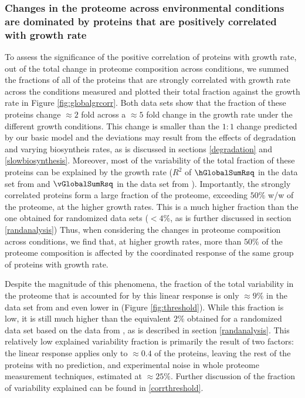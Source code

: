 \subsubsection{Changes in the proteome across environmental conditions are dominated by proteins that are positively correlated with growth rate}
To assess the significance of the positive correlation of proteins with growth rate, out of the total change in proteome composition across conditions, we summed the fractions of all of the proteins that are strongly correlated with growth rate across the conditions measured and plotted their total fraction against the growth rate in Figure \ref{fig:globalgrcorr}.
Both data sets show that the fraction of these proteins change $\approx 2$ fold across a $\approx 5$ fold change in the growth rate under the different growth conditions.
This change is smaller than the $1:1$ change predicted by our basic model and the deviations may result from the effects of degradation and varying biosyntheis rates, as is discussed in sections \ref{degradation} and \ref{slowbiosynthesis}.
Moreover, most of the variability of the total fraction of these proteins can be explained by the growth rate ($R^2$ of $\hGlobalSumRsq$ in the data set from \cite{Heinemann2015} and $\vGlobalSumRsq$ in the data set from \cite{Peebo_2015}). 
Importantly, the strongly correlated proteins form a large fraction of the proteome, exceeding $50\%$ w/w of the proteome, at the higher growth rates.
This is a much higher fraction than the one obtained for randomized data sets ($<4\%$, as is further discussed in section \ref{randanalysis})
Thus, when considering the changes in proteome composition across conditions, we find that, at higher growth rates, more than $50\%$ of the proteome composition is affected by the coordinated response of the same group of proteins with growth rate.

Despite the magnitude of this phenomena, the fraction of the total variability in the proteome that is accounted for by this linear response is only $\approx 9\%$  in the data set from \cite{Heinemann2015} and even lower in \cite{Peebo_2015} (Figure \ref{fig:threshold}).
While this fraction is low, it is still much higher than the equivalent $2\%$ obtained for a randomized data set based on the data from \cite{Heinemann2015}, as is described in section \ref{randanalysis}.
This relatively low explained variability fraction is primarily the result of two factors: the linear response applies only to $\approx0.4$ of the proteins, leaving the rest of the proteins with no prediction, and experimental noise in whole proteome measurement techniques, estimated at $\approx25\%$.
Further discussion of the fraction of variability explained can be found in \ref{corrthreshold}.